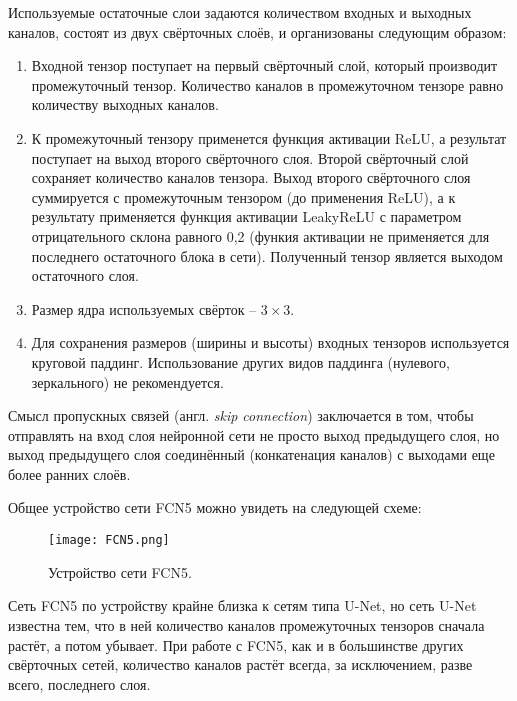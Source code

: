 Используемые остаточные слои задаются количеством входных и выходных каналов, состоят из двух свёрточных слоёв, и организованы следующим образом:
\begin{enumerate}
\item Входной тензор поступает на первый свёрточный слой, который производит промежуточный тензор. Количество каналов в промежуточном тензоре равно количеству выходных каналов.
\item К промежуточный тензору применется функция активации ReLU, а результат поступает на выход второго свёрточного слоя. Второй свёрточный слой сохраняет количество каналов тензора.
Выход второго свёрточного слоя суммируется с промежуточным тензором (до применения ReLU), а к результату применяется функция активации LeakyReLU с параметром отрицательного склона равного 0,2 (функия активации не применяется для последнего остаточного блока в сети). Полученный тензор является выходом остаточного слоя.
\item Размер ядра используемых свёрток -- $3\times3$.
\item Для сохранения размеров (ширины и высоты) входных тензоров используется круговой паддинг. Использование других видов паддинга (нулевого, зеркального) не рекомендуется.
\end{enumerate}

Смысл пропускных связей (англ. \textit{skip connection}) заключается в том, чтобы отправлять на вход слоя нейронной сети не просто выход предыдущего слоя, но выход предыдущего слоя соединённый (конкатенация каналов) с выходами еще более ранних слоёв.

Общее устройство сети FCN5 можно увидеть на следующей схеме:
\begin{figure}[H]
	\centering
	\texttt{[image: FCN5.png]}
	\caption{Устройство сети FCN5.}
	\label{fig_fcn5}
\end{figure}

Сеть FCN5 по устройству крайне близка к сетям типа U-Net\cite{unet}, но сеть U-Net известна тем, что в ней количество каналов промежуточных тензоров сначала растёт, а потом убывает. При работе с FCN5, как и в большинстве других свёрточных сетей, количество каналов растёт всегда, за исключением, разве всего, последнего слоя.

